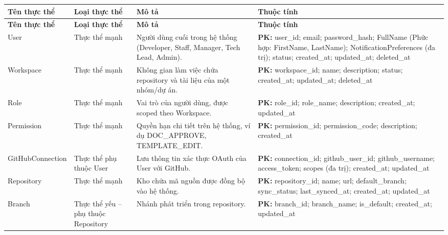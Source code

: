 \begingroup
\setlength{\tabcolsep}{4pt} %
\small %

\begin{longtable}{|
>{\raggedright\arraybackslash}p{}|
>{\raggedright\arraybackslash}p{}|
>{\raggedright\arraybackslash}p{}|
>{\raggedright\arraybackslash}p{}|}
\hline
\textbf{Tên thực thể} &
\textbf{Loại thực thể} &
\textbf{Mô tả} &
\textbf{Thuộc tính} \\
\hline
\endfirsthead

\hline
\textbf{Tên thực thể} &
\textbf{Loại thực thể} &
\textbf{Mô tả} &
\textbf{Thuộc tính} \\
\hline
\endhead

User &
Thực thể mạnh &
Người dùng cuối trong hệ thống (Developer, Staff, Manager, Tech Lead, Admin). &
\textbf{PK:} user\_id; email; password\_hash; FullName (Phức hợp: FirstName, LastName); NotificationPreferences (đa trị); status; created\_at; updated\_at; deleted\_at
\\ \hline

Workspace &
Thực thể mạnh &
Không gian làm việc chứa repository và tài liệu của một nhóm/dự án. &
\textbf{PK:} workspace\_id; name; description; status; created\_at; updated\_at; deleted\_at
\\ \hline

Role &
Thực thể mạnh &
Vai trò của người dùng, được scoped theo Workspace. &
\textbf{PK:} role\_id; role\_name; description; created\_at; updated\_at
\\ \hline

Permission &
Thực thể mạnh &
Quyền hạn chi tiết trên hệ thống, ví dụ DOC\_APPROVE, TEMPLATE\_EDIT. &
\textbf{PK:} permission\_id; permission\_code; description; created\_at
\\ \hline

GitHub\allowbreak Connection &
Thực thể phụ thuộc User &
Lưu thông tin xác thực OAuth của User với GitHub. &
\textbf{PK:} connection\_id; github\_user\_id; github\_username; access\_token; scopes (đa trị); created\_at; updated\_at
\\ \hline

Repository &
Thực thể mạnh &
Kho chứa mã nguồn được đồng bộ vào hệ thống. &
\textbf{PK:} repository\_id; name; url; default\_branch; sync\_status; last\_synced\_at; created\_at; updated\_at
\\ \hline

Branch &
Thực thể yếu -- phụ thuộc Repository &
Nhánh phát triển trong repository. &
\textbf{PK:} branch\_id; branch\_name; is\_default; created\_at; updated\_at
\\ \hline


\end{longtable}

